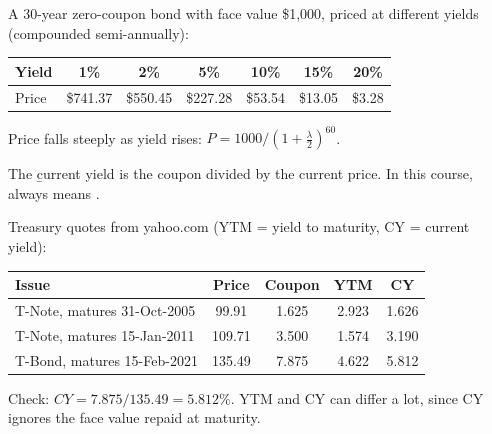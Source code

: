 \begin{example}
    A 30-year zero-coupon bond with face value \$1,000, priced at different yields (compounded semi-annually):
    \begin{center}
    \begin{tabular}{lcccccc}
        \toprule
        Yield & 1\% & 2\% & 5\% & 10\% & 15\% & 20\%\\
        \midrule
        Price & \$741.37 & \$550.45 & \$227.28 & \$53.54 & \$13.05 & \$3.28\\
        \bottomrule
    \end{tabular}
    \end{center}
    \begin{center}
    \end{center}
    Price falls steeply as yield rises: $P = 1000/\left(1+\frac{\lambda}{2}\right)^{60}$.
\end{example}

The \b{current yield} is the coupon divided by the current price. In this course,  always means .

\begin{example}
    Treasury quotes from yahoo.com (YTM = yield to maturity, CY = current yield):
    \begin{center}
    \begin{tabular}{lcccc}
        \toprule
        Issue & Price & Coupon & YTM & CY\\
        \midrule
        T-Note, matures 31-Oct-2005 & 99.91 & 1.625 & 2.923 & 1.626\\
        T-Note, matures 15-Jan-2011 & 109.71 & 3.500 & 1.574 & 3.190\\
        T-Bond, matures 15-Feb-2021 & 135.49 & 7.875 & 4.622 & 5.812\\
        \bottomrule
    \end{tabular}
    \end{center}
    Check: $CY = 7.875/135.49 = 5.812\%$. YTM and CY can differ a lot, since CY ignores the face value repaid at maturity.
\end{example}

